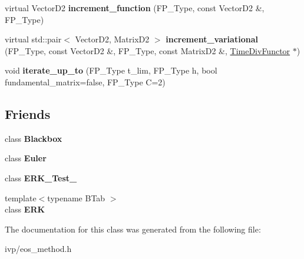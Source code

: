 \begin{DoxyCompactItemize}
virtual Vector\+D2 {\bfseries increment\+\_\+function} (F\+P\+\_\+\+Type, const Vector\+D2 \&, F\+P\+\_\+\+Type)
\item 
\mbox{\label{classOneStepMethod_ac567c56e09ebb6c8800349eb4d21f966}} 
virtual std\+::pair$<$ Vector\+D2, Matrix\+D2 $>$ {\bfseries increment\+\_\+variational} (F\+P\+\_\+\+Type, const Vector\+D2 \&, F\+P\+\_\+\+Type, const Matrix\+D2 \&, \hyperlink{classTimeDivFunctor}{Time\+Div\+Functor} $\ast$)
\item 
\mbox{\label{classOneStepMethod_aafded57f36af4edf0840cb747dbdc5ea}} 
void {\bfseries iterate\+\_\+up\+\_\+to} (F\+P\+\_\+\+Type t\+\_\+lim, F\+P\+\_\+\+Type h, bool fundamental\+\_\+matrix=false, F\+P\+\_\+\+Type C=2)
\end{DoxyCompactItemize}
\subsection*{Friends}
\begin{DoxyCompactItemize}
\item 
\mbox{\label{classOneStepMethod_af3aa570b8e278b935d7dc84d2774ccb7}} 
class {\bfseries Blackbox}
\item 
\mbox{\label{classOneStepMethod_a9e8c94ebada889fba517c82fc3408d32}} 
class {\bfseries Euler}
\item 
\mbox{\label{classOneStepMethod_a146a867264afb1cda48fa788ceca1f13}} 
class {\bfseries E\+R\+K\+\_\+\+Test\+\_}
\item 
\mbox{\label{classOneStepMethod_a55adbdc4c0fea0e770e4d18b0379d490}} 
{\footnotesize template$<$typename B\+Tab $>$ }\\class {\bfseries E\+RK}
\end{DoxyCompactItemize}


The documentation for this class was generated from the following file\+:\begin{DoxyCompactItemize}
\item 
ivp/eos\+\_\+method.\+h\end{DoxyCompactItemize}
